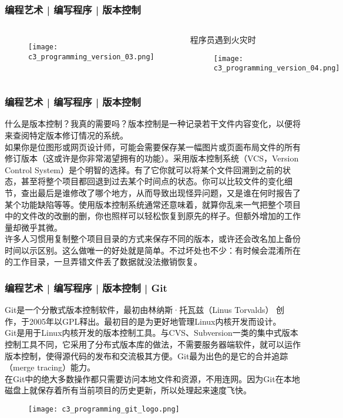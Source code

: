 \begin{frame}
  \frametitle{编程艺术 | 编写程序 | 版本控制}
  \begin{columns}
  \begin{figure}
    \centering
    \texttt{[image: c3\_programming\_version\_03.png]}
  \end{figure}
  \begin{block}{程序员遇到火灾时}
  \begin{figure}
    \centering
    \texttt{[image: c3\_programming\_version\_04.png]}
  \end{figure}
  \end{block}
\end{columns}
\end{frame}

\begin{frame}
  \frametitle{编程艺术 | 编写程序 | 版本控制}
  什么是版本控制？我真的需要吗？版本控制是一种记录若干文件内容变化，以便将来查阅特定版本修订情况的系统。\\
  \vspace{1em}
  如果你是位图形或网页设计师，可能会需要保存某一幅图片或页面布局文件的所有修订版本（这或许是你非常渴望拥有的功能）。采用版本控制系统（VCS，Version Control System）是个明智的选择。有了它你就可以将某个文件回溯到之前的状态，甚至将整个项目都回退到过去某个时间点的状态。你可以比较文件的变化细节，查出最后是谁修改了哪个地方，从而导致出现怪异问题，又是谁在何时报告了某个功能缺陷等等。使用版本控制系统通常还意味着，就算你乱来一气把整个项目中的文件改的改删的删，你也照样可以轻松恢复到原先的样子。但额外增加的工作量却微乎其微。\\
  \vspace{1em}
  许多人习惯用复制整个项目目录的方式来保存不同的版本，或许还会改名加上备份时间以示区别。这么做唯一的好处就是简单。不过坏处也不少：有时候会混淆所在的工作目录，一旦弄错文件丢了数据就没法撤销恢复。
\end{frame}

\begin{frame}
  \frametitle{编程艺术 | 编写程序 | 版本控制 | \alert{Git}}
  Git是一个\alert{分散式版本控制软件}，最初由\alert{林纳斯·托瓦兹（Linus Torvalds）} 创作，于2005年以GPL释出。最初目的是为更好地管理Linux内核开发而设计。\\
  \vspace{0.5em}
Git是用于Linux内核开发的版本控制工具。与CVS、Subversion一类的集中式版本控制工具不同，它采用了\alert{分布式版本库}的做法，不需要服务器端软件，就可以运作版本控制，使得源代码的发布和交流极其方便。Git最为出色的是它的合并追踪（merge tracing）能力。\\
\vspace{0.5em}
在Git中的绝大多数操作都只需要访问本地文件和资源，不用连网。因为Git在本地磁盘上就保存着所有当前项目的历史更新，所以处理起来速度飞快。
\begin{figure}
  \centering
  \texttt{[image: c3\_programming\_git\_logo.png]}
\end{figure}
\end{frame}

